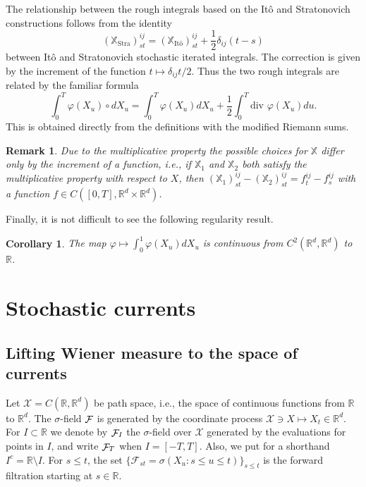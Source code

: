 \documentclass[a4paper,11pt]{article}
\newtheorem{corollary}[theorem]{Corollary}
\newtheorem{remark}[theorem]{Remark}
\newcommand{\R}{\mathbb{R}}
\newcommand{\F}{\mathop{\mathrm{{\cal F}}}\nolimits}
\newcommand{\X}{\mathcal{X}}
\begin{document}
The relationship between the rough integrals based on the It\^o and 
Stratonovich constructions follows from the identity
$$
(\mathbb{X}_{\text{Stra}})_{st}^{ij} =
(\mathbb{X}_{\text{It\^o}})_{st}^{ij} + \frac{1}{2} \delta_{ij} (t-s)
$$
between It\^o and Stratonovich stochastic iterated integrals. The
correction is given by the increment of the function $t \mapsto
\delta_{ij} t/2$. Thus the two rough integrals are related by the 
familiar formula
$$
\int_0^T \varphi(X_u) \circ dX_u = \int_0^T \varphi(X_u) dX_u +
\frac{1}{2} \int_0^T \text{div } \varphi(X_u) du.
$$
This is obtained directly from the definitions with the modified
Riemann sums. 

\begin{remark}
\rm{
Due to the multiplicative property the possible choices for 
$\mathbb{X}$ differ only by the increment of a function, i.e., 
if $\mathbb{X}_1$ and $\mathbb{X}_2$ both satisfy the 
multiplicative property with respect to $X$, then
$
(\mathbb{X}_1)_{st}^{ij}- (\mathbb{X}_2)_{st}^{ij} = 
f^{ij}_t-f^{ij}_s
$ 
with a function $f \in C([0,T],\R^d\times \R^d)$.   
}
\end{remark}

Finally, it is not difficult to see the following regularity result.
\begin{corollary}
The map $\varphi \mapsto \int_0^1 \varphi(X_u) dX_u$ is continuous
from $C^2(\R^d,\R^d)$ to $\R$.  
\end{corollary}

\section{Stochastic currents}
\subsection{Lifting Wiener measure to the space of currents}
Let $\X = C(\R, \R^d)$ be path space, i.e., the space of continuous
functions from $\R$ to $\R^d$. The $\sigma$-field $\F$ is generated by 
the coordinate process $\X \ni X \mapsto X_t \in \R^d$. For $I \subset 
\R$ we denote by $\F_I$ the $\sigma$-field over $\X$ generated by the 
evaluations for points in $I$, and write $\F_T$ when $I =
[-T,T]$. Also, we put for a shorthand $I^c = \R \setminus I$. 
For $s \leq t$, the set $\{\mathcal{F}_{st} = 
\sigma(X_u : s \le u \le t)\}_{s \leq t}$ is the forward filtration 
starting at $s \in \R$.
\end{document}
